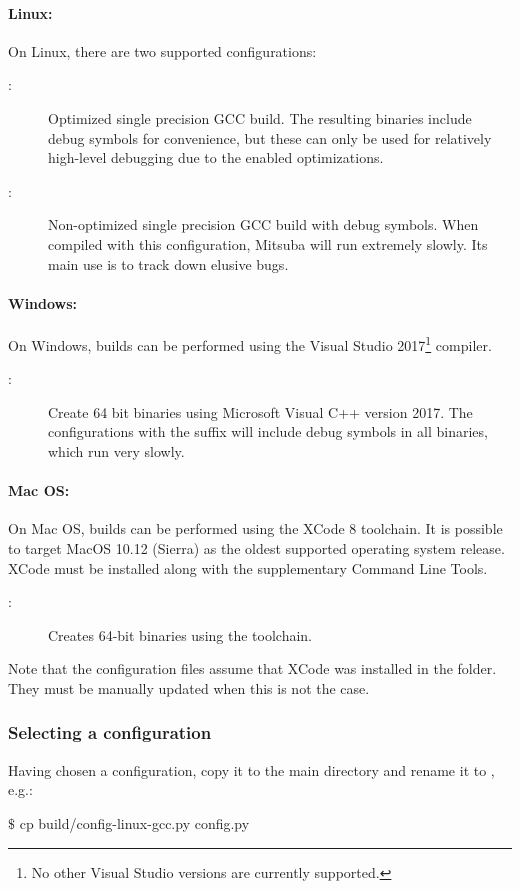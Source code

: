 \paragraph{Linux:}
On Linux, there are two supported configurations:
\begin{description}
\item[:] Optimized single precision GCC build. The resulting binaries include debug symbols for convenience, but these can only be used for relatively high-level debugging due to the enabled optimizations.
\item[:] Non-optimized single precision GCC build with debug symbols. When compiled with this configuration, Mitsuba
will run extremely slowly. Its main use is to track down elusive bugs.
\end{description}
\paragraph{Windows:}
On Windows, builds can be performed using the Visual Studio 2017\footnote{No other Visual Studio versions are currently supported.}
compiler.
\begin{description}
\item[:] Create 64 bit binaries using Microsoft Visual C++ version 2017.
The configurations with the suffix  will include debug symbols in all binaries, which run very slowly.
\end{description}
\paragraph{Mac OS:}
On Mac OS, builds can be performed using the XCode 8  toolchain.
It is possible to target MacOS 10.12 (Sierra) as the oldest supported operating system release.
XCode must be installed along with the supplementary Command Line Tools.
\begin{description}
\item[:] Creates 64-bit binaries using the  toolchain.
\end{description}
Note that the configuration files assume that XCode was
installed in the  folder. They must be manually updated
when this is not the case.
\subsubsection{Selecting a configuration}
Having chosen a configuration, copy it to the main directory and rename it to , e.g.:
\begin{shell}
$\texttt{\$}$ cp build/config-linux-gcc.py config.py
\end{shell}

